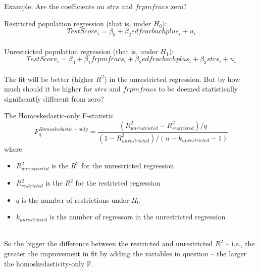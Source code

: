\documentclass[notes,10pt, aspectratio=169]{beamer}
\begin{document}
\begin{frame}{Example: Are the coefficients on $strs$ and $frpmfracs$ zero?}


Restricted population regression (that is, under $H_0$):
\begin{equation*}
    TestScore_i = \beta_0 + \beta_2 edfracbachplus_i + u_i
\end{equation*}
\\[1em]
Unrestricted population regression (that is, under $H_1$):
\begin{equation*}
    TestScore_i = \beta_0 + \beta_1 frpmfracs_i + \beta_2 edfracbachplus_i + \beta_3 strs_i + u_i
\end{equation*}
\\[1em]
The fit will be better (higher $R^2$) in the unrestricted regression. But by how much should it be higher for $strs$ and $frpmfracs$ to be deemed statistically significantly different from zero?
\end{frame}


\begin{frame}{The Homoskedastic-only F-statistic}
\begin{equation*}
    F^{Homoskedastic-only}_q=\frac{(R^2_{unrestricted}-R^2_{restricted})/q}{(1-R^2_{unrestricted})/(n-k_{unrestricted}-1)}
\end{equation*}
where
\begin{itemize}
    \item $R^2_{unrestricted}$ is the $R^2$ for the unrestricted regression
    \item $R^2_{restricted}$ is the $R^2$ for the restricted regression
    \item $q$ is the number of restrictions under $H_0$
    \item $k_{unrestricted}$ is the number of regressors in the unrestricted regression
\end{itemize}\\[1em]
So the bigger the difference between the restricted and unrestricted $R^2$ -- i.e., the greater the improvement in fit by adding the variables in question -- the larger the homoskedasticity-only F.

\end{frame}
\end{document}
